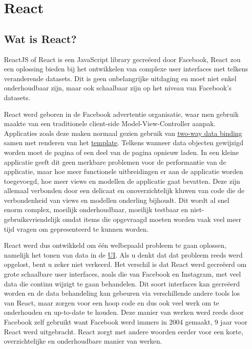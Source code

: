 \chapter{React}\label{ch:react}

\section{Wat is React?}\label{sec:what}
	
	ReactJS of React is een JavaScript library gecreëerd door Facebook, React zou een oplossing bieden bij het ontwikkelen van complexe user interfaces met telkens veranderende datasets. Dit is geen onbelangrijke uitdaging en moet niet enkel onderhoudbaar zijn, maar ook schaalbaar zijn op het niveau van Facebook’s datasets.
	
	React werd geboren in de Facebook advertentie organisatie, waar men gebruik maakte van een traditionele client-side Model-View-Controller aanpak. Applicaties zoals deze maken normaal gezien gebruik van \hyperref[twdb]{two-way data binding} samen met renderen van het \hyperref[template]{template}. Telkens wanneer data objecten gewijzigd worden moet de pagina of een deel van de pagina opnieuw laden. In een kleine applicatie geeft dit geen merkbare problemen voor de performantie van de applicatie, maar hoe meer functionele uitbreidingen er aan de applicatie worden toegevoegd, hoe meer views en modellen de applicatie gaat bevatten. Deze zijn allemaal verbonden door een delicaat en onoverzichtelijk kluwen van code die de verbondenheid van views en modellen onderling bijhoudt. Dit wordt al snel enorm complex, moeilijk onderhoudbaar, moeilijk testbaar en niet-gebruiksvriendelijk omdat items die opgevraagd moeten worden vaak veel meer tijd vragen om gepresenteerd te kunnen worden.
	
	React werd dus ontwikkeld om één welbepaald probleem te gaan oplossen, namelijk het tonen van data in de \hyperref[ui]{UI}. Als u denkt dat dat probleem reeds werd opgelost, bent u zeker niet verkeerd. Het verschil is dat React werd gecreëerd om grote schaalbare user interfaces, zoals die van Facebook en Instagram, met veel data die continu wijzigt te gaan behandelen. Dit soort interfaces kan gecreëerd worden en de data behandeling kan gebeuren via verschillende andere tools los van React, maar zorgen voor een hoop code en dus ook veel werk om te onderhouden en up-to-date te houden. Deze manier van werken werd reeds door Facebook zelf gebruikt want Facebook werd immers in 2004 gemaakt, 9 jaar voor React werd uitgebracht. React zorgt met andere woorden eerder voor een korte, overzichtelijke en onderhoudbare manier van werken.
	
